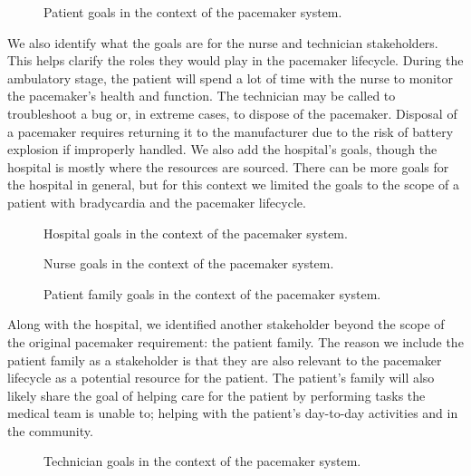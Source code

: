\begin{figure}
	\centering
	
	\caption{Patient goals in the context of the pacemaker system.}
	\label{fig:patient_goals}
\end{figure}

We also identify what the goals are for the nurse and technician stakeholders. This helps clarify the roles they would play in the pacemaker lifecycle. During the ambulatory stage, the patient will spend a lot of time with the nurse to monitor the pacemaker's health and function. The technician may be called to troubleshoot a bug or, in extreme cases, to dispose of the pacemaker. Disposal of a pacemaker requires returning it to the manufacturer due to the risk of battery explosion if improperly handled. We also add the hospital's goals, though the hospital is mostly where the resources are sourced. There can be more goals for the hospital in general, but for this context we limited the goals to the scope of a patient with bradycardia and the pacemaker lifecycle.

\begin{figure}
	\centering
	
	\caption{Hospital goals in the context of the pacemaker system.}
	\label{fig:hospital_goals}
\end{figure}

\begin{figure}
	\centering
	
	\caption{Nurse goals in the context of the pacemaker system.}
	\label{fig:nurse_goals}
\end{figure}

\begin{figure}
	\centering
	
	\caption{Patient family goals in the context of the pacemaker system.}
	\label{fig:patient_family_goals}
\end{figure}

Along with the hospital, we identified another stakeholder beyond the scope of the original pacemaker requirement: the patient family. The reason we include the patient family as a stakeholder is that they are also relevant to the pacemaker lifecycle as a potential resource for the patient. The patient's family will also likely share the goal of helping care for the patient by performing tasks the medical team is unable to; helping with the patient's day-to-day activities and in the community.

\begin{figure}
	\centering
	
	\caption{Technician goals in the context of the pacemaker system.}
	\label{fig:technician_goals}
\end{figure}

